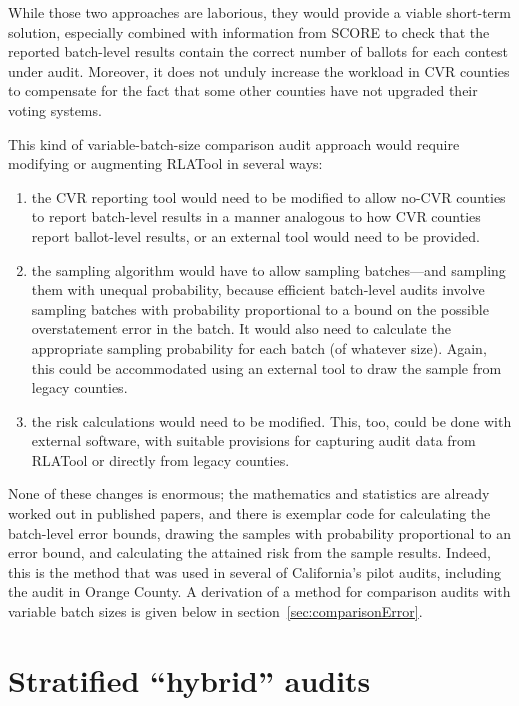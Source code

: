 \documentclass[12pt]{article}
\begin{document}
While those two approaches are laborious, they would provide a viable short-term solution,
especially combined with information from SCORE to check that the reported batch-level results contain the correct number of ballots for each contest under audit.
Moreover, it does not unduly increase the workload in CVR counties
to compensate for the fact that some other counties have not upgraded their voting
systems.

This kind of variable-batch-size comparison audit approach would require modifying or augmenting
RLATool in several ways: 

\begin{enumerate}

  \item the CVR reporting tool would need to be modified to allow no-CVR counties to
report batch-level results in a manner analogous to how CVR counties report
ballot-level results, or an external tool would need to be provided.

  \item the sampling
algorithm would have to allow sampling batches---and sampling them with unequal probability,
because efficient batch-level audits involve sampling batches with probability proportional
to a bound on the possible overstatement error in the batch.
It would also need to calculate the appropriate sampling probability for each batch (of whatever size).
Again, this could be accommodated using an external tool to draw the sample from legacy counties.

  \item the risk calculations would need to be modified. 
This, too, could be done with external software, with suitable provisions for capturing audit data
from RLATool or directly from legacy counties.
\end{enumerate}

None of these changes is enormous; the mathematics and statistics are already worked out
in published papers, and there is exemplar code for calculating the
batch-level error bounds, drawing the samples with probability proportional to an
error bound, and calculating the attained risk from the sample results.
Indeed, this is the method that was used in several of California's pilot audits,
including the audit in Orange County.
A derivation of a method for comparison audits with variable batch sizes is given below
in section~\ref{sec:comparisonError}.

\section{Stratified ``hybrid'' audits} \label{sec:hybrid}
\end{document}
